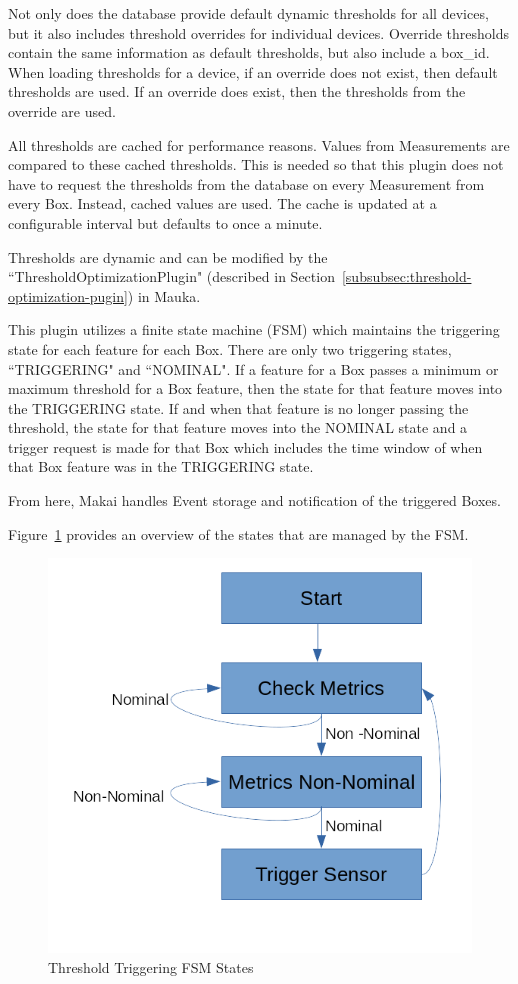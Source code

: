 Not only does the database provide default dynamic thresholds for all devices, but it also includes threshold overrides for individual devices. Override thresholds contain the same information as default thresholds, but also include a box\_id. When loading thresholds for a device, if an override does not exist, then default thresholds are used. If an override does exist, then the thresholds from the override are used.

All thresholds are cached for performance reasons. Values from Measurements are compared to these cached thresholds. This is needed so that this plugin does not have to request the thresholds from the database on every Measurement from every Box. Instead, cached values are used. The cache is updated at a configurable interval but defaults to once a minute.

Thresholds are dynamic and can be modified by the ``ThresholdOptimizationPlugin" (described in Section~\ref{subsubsec:threshold-optimization-pugin}) in Mauka.

This plugin utilizes a finite state machine (FSM) which maintains the triggering state for each feature for each Box. There are only two triggering states, ``TRIGGERING" and ``NOMINAL". If a feature for a Box passes a minimum or maximum threshold for a Box feature, then the state for that feature moves into the TRIGGERING state. If and when that feature is no longer passing the threshold, the state for that feature moves into the NOMINAL state and a trigger request is made for that Box which includes the time window of when that Box feature was in the TRIGGERING state.

From here, Makai handles Event storage and notification of the triggered Boxes.

Figure~\ref{fig:threshold_triggering} provides an overview of the states that are managed by the FSM\@.

\begin{figure}
	\centering
	\includegraphics[width=.75\linewidth]{figures/trigger_fsn.png}
	\caption{Threshold Triggering FSM States}
	\label{fig:threshold_triggering}
\end{figure}


